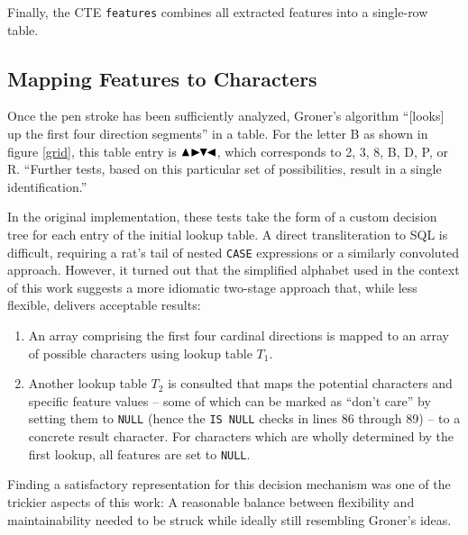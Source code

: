 \documentclass[sigconf]{acmart}
\begin{document}
Finally, the CTE \texttt{features} combines all extracted features into a single-row table.

\subsection{Mapping Features to Characters}

Once the pen stroke has been sufficiently analyzed, Groner's algorithm \enquote{[looks] up the first four direction segments} in a table. For the letter B as shown in figure \ref{grid}, this table entry is $\blacktriangle\hspace{-0.26em}\blacktriangleright\hspace{-0.40em}\blacktriangledown\hspace{-0.40em}\blacktriangleleft$, which corresponds to 2, 3, 8, B, D, P, or R. \enquote{Further tests, based on this particular set of possibilities, result in a single identification.} \cite{groner}

In the original implementation, these tests take the form of a custom decision tree for each entry of the initial lookup table. A direct transliteration to SQL is difficult, requiring a rat's tail of nested \texttt{CASE} expressions or a similarly convoluted approach. However, it turned out that the simplified alphabet used in the context of this work suggests a more idiomatic two-stage approach that, while less flexible, delivers acceptable results:

\begin{enumerate}[nolistsep]
    \item An array comprising the first four cardinal directions is mapped to an array of possible characters using lookup table $T_1$.
    \item Another lookup table $T_2$ is consulted that maps the potential characters and specific feature values – some of which can be marked as \enquote{don't care} by setting them to \texttt{NULL} (hence the \texttt{IS NULL} checks in lines 86 through 89) – to a concrete result character. For characters which are wholly determined by the first lookup, all features are set to \texttt{NULL}.
\end{enumerate}

Finding a satisfactory representation for this decision mechanism was one of the trickier aspects of this work: A reasonable balance between flexibility and maintainability needed to be struck while ideally still resembling Groner's ideas.
\end{document}
